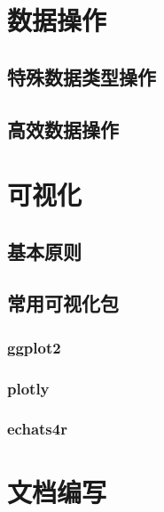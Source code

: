 \documentclass[]{book}
\begin{document}
\hypertarget{section-23}{%
\chapter{数据操作}\label{section-23}}

\hypertarget{section-24}{%
\section{特殊数据类型操作}\label{section-24}}

\hypertarget{section-25}{%
\section{高效数据操作}\label{section-25}}

\hypertarget{section-26}{%
\chapter{可视化}\label{section-26}}

\hypertarget{section-27}{%
\section{基本原则}\label{section-27}}

\hypertarget{section-28}{%
\section{常用可视化包}\label{section-28}}

\hypertarget{ggplot2}{%
\subsection{ggplot2}\label{ggplot2}}

\hypertarget{plotly}{%
\subsection{plotly}\label{plotly}}

\hypertarget{echats4r}{%
\subsection{echats4r}\label{echats4r}}

\hypertarget{section-29}{%
\chapter{文档编写}\label{section-29}}
\end{document}
